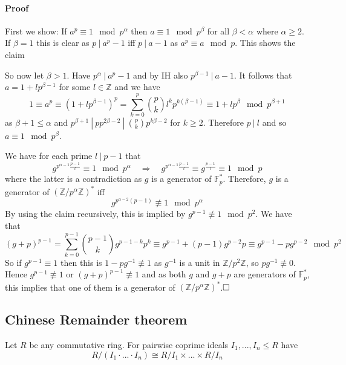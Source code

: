 \documentclass{scrartcl}
\newcommand{\Z}{\mathbb{Z}}
\newcommand{\divides}{\ | \ }
\begin{document}
\paragraph{Proof} 
First we show: If $a^p \equiv 1 \mod p^\alpha$ then $a \equiv 1 \mod p^\beta$ for all $\beta < \alpha$ where $\alpha \geq 2$.
If $\beta = 1$ this is clear as $p \divides a^p - 1$ iff $p \divides a - 1$ as $a^p \equiv a \mod p$.
This shows the claim

So now let $\beta > 1$. Have $p^\alpha \divides a^p - 1$ and by IH also $p^{\beta - 1} \divides a - 1$.
It follows that $a = 1 + l p^{\beta - 1}$ for some $l \in \Z$ and we have
\begin{equation*}
    1 \equiv a^p \equiv (1 + l p^{\beta - 1})^p = \sum_{k = 0}^p \binom{p}{k} l^k p^{k(\beta - 1)} \equiv 1 + l p^{\beta} \mod p^{\beta + 1}
\end{equation*}
as $\beta + 1 \leq \alpha$ and $p^{\beta + 1} \divides p p^{2\beta - 2} \divides \binom{p}{k} p^{k\beta - 2}$ for $k \geq 2$.
Therefore $p \divides l$ and so $a \equiv 1 \mod p^{\beta}$.

We have for each prime $l \divides p - 1$ that
\begin{equation*}
    g^{p^{\alpha - 1} \frac {p - 1} l} \equiv 1 \mod p^\alpha \quad \Rightarrow \quad g^{p^{\alpha - 1} \frac {p - 1} l} \equiv g^{\frac {p - 1} l} \equiv 1 \mod p
\end{equation*}
where the latter is a contradiction as $g$ is a generator of $\mathbb{F}_p^*$. Therefore, $g$ is a generator of $(\Z/p^\alpha\Z)^*$ iff 
\begin{equation*}
    g^{p^{\alpha - 2} (p - 1)} \not\equiv 1 \mod p^\alpha
\end{equation*}
By using the claim recursively, this is implied by $g^{p - 1} \not\equiv 1 \mod p^2$. We have that
\begin{equation*}
    (g + p)^{p - 1} = \sum_{k = 0}^{p - 1} \binom{p - 1}{k} g^{p - 1 - k} p^k \equiv g^{p - 1} + (p - 1)g^{p - 2}p \equiv g^{p - 1} - p g^{p - 2} \mod p^2
\end{equation*}
So if $g^{p - 1} \equiv 1$ then this is $1 - p g^{-1} \not\equiv 1$ as $g^{-1}$ is a unit in $\Z/p^2\Z$, so $p g^{-1} \not\equiv 0$. 
Hence $g^{p - 1} \not\equiv 1$ or $(g + p)^{p - 1} \not\equiv 1$ and as both $g$ and $g + p$ are generators of $\mathbb{F}_p^*$, this implies that one of them is a generator of $(\Z/p^\alpha\Z)^*$.$\hfill\square$

\subsection{Chinese Remainder theorem}
Let $R$ be any commutative ring. For pairwise coprime ideals $I_1, ..., I_n \leq R$ have
\begin{equation*}
    R/(I_1 \cdot ... \cdot I_n) \cong R/I_1 \times ... \times R/I_n
\end{equation*}
\end{document}

